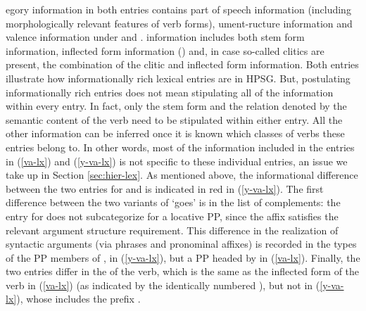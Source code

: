 \documentclass[output=paper
                ,modfonts
                ,nonflat
	        ,collection
	        ,collectionchapter
	        ,collectiontoclongg
 	        ,biblatex
                ,babelshorthands
                ,newtxmath
                ,draftmode
                ,colorlinks, citecolor=brown
]{./langsci/langscibook}
\begin{document}
{\ea
\label{y-va-lx}
\z


egory information in both entries contains part of speech information (including
morphologically relevant features of verb forms), ument-ructure information
and valence information under \subj and \comps.  information includes both stem form information, inflected form information () and, in case so-called clitics are present, the combination of the clitic and inflected form information. Both entries illustrate how informationally rich lexical entries are in HPSG. But, postulating informationally rich entries does not mean stipulating all of the information within every entry. In fact, only the stem form and the relation denoted by the semantic content of the verb  need to be stipulated within either entry. All the other information can be inferred once it is known which classes of verbs these entries belong to. In other words, most of the information included in the entries in (\ref{va-lx}) and (\ref{y-va-lx}) is not specific to these individual entries, an issue we take up in Section \ref{sec:hier-lex}.  As mentioned above, the informational difference between the two entries for  and  is indicated in red in (\ref{y-va-lx}). The first difference between the two variants of  `goes' is in the list of complements: the entry for  does not subcategorize for a locative PP, since the affix  satisfies the relevant argument structure requirement. This difference in the realization of syntactic arguments (via phrases and pronominal affixes) is recorded in the types of the PP members of ,  in (\ref{y-va-lx}), but a PP headed by  in (\ref{va-lx}). Finally, the two entries differ in the  of the verb, which is the same as the inflected form of the verb in (\ref{va-lx}) (as indicated by the identically numbered ), but not in (\ref{y-va-lx}), whose  includes the prefix .  

}
\end{document}
